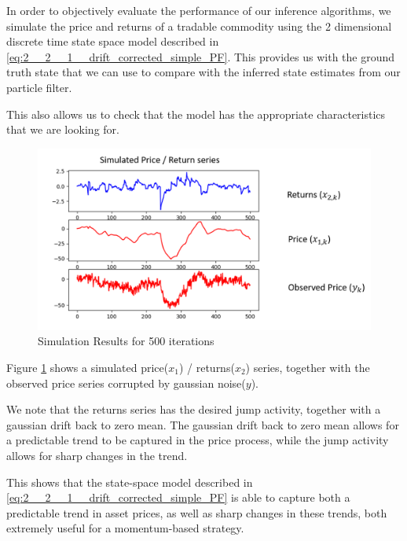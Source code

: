 \documentclass[../main.tex]{subfiles}
\begin{document}
	
In order to objectively evaluate the performance of our inference algorithms, we simulate the price and returns of a tradable commodity using the 2 dimensional discrete time state space model described in \autoref{eq:2__2__1__drift_corrected_simple_PF}. This provides us with the ground truth state that we can use to compare with the inferred state estimates from our particle filter.

This also allows us to check that the model has the appropriate characteristics that we are looking for. 

\begin{figure}[h!]
	\centering
	\includegraphics[width=12.0cm]{../plots/3__1__1__simulation.png}
	\caption{Simulation Results for 500 iterations}
	\label{fig:3__1__1__simulation}
\end{figure}


Figure \ref{fig:3__1__1__simulation} shows a simulated price($x_1$) / returns($x_2$) series, together with the observed price series corrupted by gaussian noise($y$). 

We note that the returns series has the desired jump activity, together with a gaussian drift back to zero mean. The gaussian drift back to zero mean allows for a predictable trend to be captured in the price process, while the jump activity allows for sharp changes in the trend. 

This shows that the state-space model described in \autoref{eq:2__2__1__drift_corrected_simple_PF} is able to capture both a predictable trend in asset prices, as well as sharp changes in these trends, both extremely useful for a momentum-based strategy. 
\end{document}
